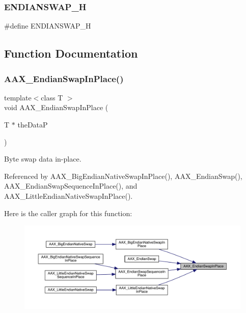 \subsubsection{\texorpdfstring{ENDIANSWAP\_H}{ENDIANSWAP\_H}}
{\footnotesize\ttfamily \#define E\+N\+D\+I\+A\+N\+S\+W\+A\+P\+\_\+H}



\subsection{Function Documentation}
\mbox{\label{a00488_a121ee6a20eb996039b0f187db0a2cc8e}} 
\subsubsection{\texorpdfstring{AAX\_EndianSwapInPlace()}{AAX\_EndianSwapInPlace()}}
{\footnotesize\ttfamily template$<$class T $>$ \\
void A\+A\+X\+\_\+\+Endian\+Swap\+In\+Place (\begin{DoxyParamCaption}\item[{T $\ast$}]{the\+DataP }\end{DoxyParamCaption})\hspace{0.3cm}{\ttfamily [inline]}}



Byte swap data in-\/place. 



Referenced by A\+A\+X\+\_\+\+Big\+Endian\+Native\+Swap\+In\+Place(), A\+A\+X\+\_\+\+Endian\+Swap(), A\+A\+X\+\_\+\+Endian\+Swap\+Sequence\+In\+Place(), and A\+A\+X\+\_\+\+Little\+Endian\+Native\+Swap\+In\+Place().

Here is the caller graph for this function\+:
\nopagebreak
\begin{figure}[H]
\begin{center}
\leavevmode
\includegraphics[width=350pt]{a00488_a121ee6a20eb996039b0f187db0a2cc8e_icgraph}
\end{center}
\end{figure}
\mbox{\label{a00488_a5caa5e68dec3f028697b64ad04f0cb5c}} 
